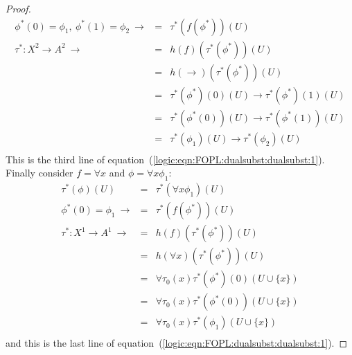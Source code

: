\begin{proof}
\begin{eqnarray*}
    \phi^{*}(0)=\phi_{1},\ \phi^{*}(1)=\phi_{2}\ \rightarrow
    &=&\tau^{*}(f(\phi^{*}))(U)\\
    \tau^{*}:X^{2}\to A^{2}\ \rightarrow
    &=&h(f)(\tau^{*}(\phi^{*}))(U)\\
    &=&h(\to)(\tau^{*}(\phi^{*}))(U)\\
    &=&\tau^{*}(\phi^{*})(0)(U)\to \tau^{*}(\phi^{*})(1)(U)\\
    &=&\tau^{*}(\phi^{*}(0))(U)\to \tau^{*}(\phi^{*}(1))(U)\\
    &=&\tau^{*}(\phi_{1})(U)\to \tau^{*}(\phi_{2})(U)\\
    \end{eqnarray*}
This is the third line of
equation~(\ref{logic:eqn:FOPL:dualsubst:dualsubst:1}). Finally
consider $f=\forall x$ and $\phi=\forall x\phi_{1}$:
    \begin{eqnarray*}
    \tau^{*}(\phi)(U)&=&\tau^{*}(\forall x\phi_{1})(U)\\
    \phi^{*}(0)=\phi_{1}\ \rightarrow
    &=&\tau^{*}(f(\phi^{*}))(U)\\
    \tau^{*}:X^{1}\to A^{1}\ \rightarrow
    &=&h(f)(\tau^{*}(\phi^{*}))(U)\\
    &=&h(\forall x)(\tau^{*}(\phi^{*}))(U)\\
    &=&\forall\tau_{0}(x)\tau^{*}(\phi^{*})(0)(U\cup\{x\})\\
    &=&\forall\tau_{0}(x)\tau^{*}(\phi^{*}(0))(U\cup\{x\})\\
    &=&\forall\tau_{0}(x)\tau^{*}(\phi_{1})(U\cup\{x\})\\
    \end{eqnarray*}
and this is the last line of
equation~(\ref{logic:eqn:FOPL:dualsubst:dualsubst:1}).
\end{proof}
